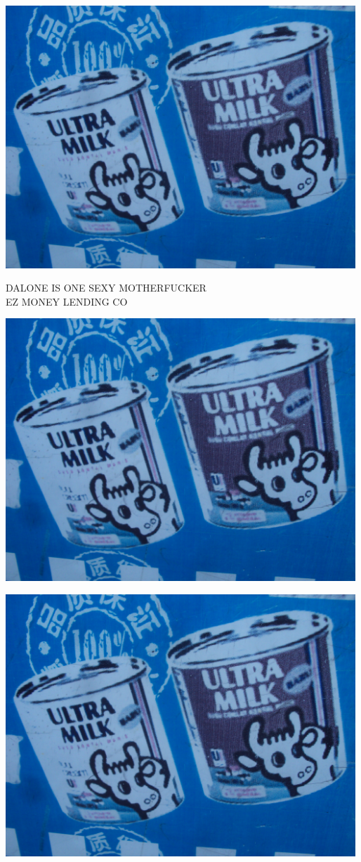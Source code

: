 \documentclass[10pt,letterpaper]{article}
\begin{document}
\vspace{0.25in}
\includegraphics[width=5.19in]{landscape.jpg}

DALONE IS ONE SEXY MOTHERFUCKER\\
EZ MONEY LENDING CO\\
\pagebreak

\includegraphics[width=5.19in]{landscape.jpg}

\vspace{0.25in}
\includegraphics[width=5.19in]{landscape.jpg}
\end{document}
